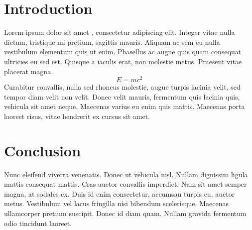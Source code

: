\section{Introduction}

Lorem ipsum dolor sit amet \citep{knf}, consectetur adipiscing elit. Integer vitae nulla dictum, tristique mi pretium, sagittis mauris. Aliquam ac sem eu nulla vestibulum elementum quis ut enim. Phasellus ac augue quis quam consequat ultricies eu sed est. Quisque a iaculis erat, non molestie metus. Praesent vitae placerat magna.
\begin{equation}
E = mc^2
\end{equation}
Curabitur convallis, nulla sed rhoncus molestie, augue turpis lacinia velit, sed tempor diam velit non velit. Donec velit mauris, fermentum quis lacinia quis, vehicula sit amet neque. Maecenas varius eu enim quis mattis. Maecenas porta laoreet risus, vitae hendrerit ex cursus sit amet.

\section{Conclusion}

Nunc eleifend viverra venenatis. Donec ut vehicula nisl. Nullam dignissim ligula mattis consequat mattis. Cras auctor convallis imperdiet. Nam sit amet semper magna, at sodales ex. Duis id enim consectetur, accumsan turpis eu, auctor metus. Vestibulum vel lacus fringilla nisi bibendum scelerisque. Maecenas ullamcorper pretium suscipit. Donec id diam quam. Nullam gravida fermentum odio tincidunt laoreet.
